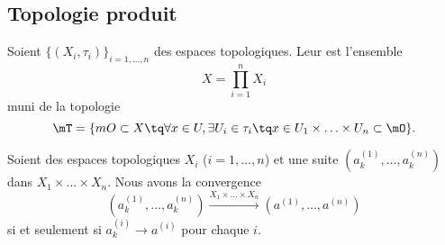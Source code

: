 \subsection{Topologie produit}

\begin{definition}      \label{DefIINHooAAjTdY}
	Soient $\{ (X_i,\tau_i) \}_{i=1,\ldots, n}$ des espaces topologiques. Leur  est l'ensemble
	\begin{equation}
		X=\prod_{i=1}^nX_i
	\end{equation}
	muni de la topologie
	\begin{equation}
		\mT=\{ mO\subset X\tq \forall x\in U,\exists U_i\in\tau_i\tq x\in U_1\times\ldots\times U_n\subset \mO \}.
	\end{equation}
\end{definition}

\begin{proposition}
	Soient des espaces topologiques \( X_i\) (\( i=1,\ldots, n\)) et une suite \( (a^{(1)}_k,\ldots, a^{(n)}_k)\) dans \( X_1\times\ldots \times X_n\). Nous avons la convergence
	\begin{equation}
		(a^{(1)}_k,\ldots, a^{(n)}_k)\stackrel{X_1\times\ldots \times X_n}{\longrightarrow}(a^{(1)},\ldots, a^{(n)})
	\end{equation}
	si et seulement si \( a^{(i)}_k\to a^{(i)}\) pour chaque \( i\).
\end{proposition}

